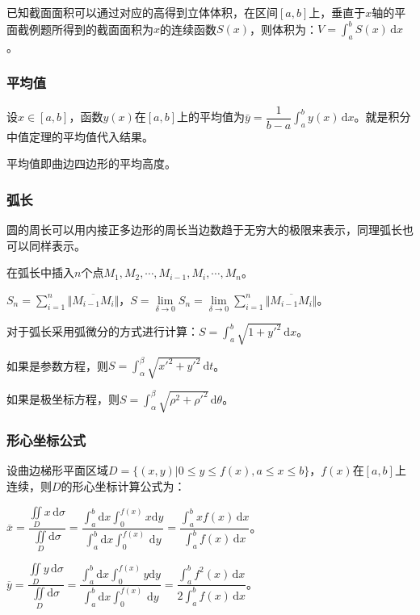 \documentclass[UTF8, 12pt]{ctexart}
\begin{document}
已知截面面积可以通过对应的高得到立体体积，在区间$[a,b]$上，垂直于$x$轴的平面截例题所得到的截面面积为$x$的连续函数$S(x)$，则体积为：$V=\int_a^bS(x)\,\textrm{d}x$。

\subsubsection{平均值}

设$x\in[a,b]$，函数$y(x)$在$[a,b]$上的平均值为$\bar{y}=\dfrac{1}{b-a}\int_a^by(x)\,\textrm{d}x$。就是积分中值定理的平均值代入结果。

平均值即曲边四边形的平均高度。

\subsubsection{弧长}

圆的周长可以用内接正多边形的周长当边数趋于无穷大的极限来表示，同理弧长也可以同样表示。

在弧长中插入$n$个点$M_1,M_2,\cdots,M_{i-1},M_i,\cdots,M_n$。

$S_n=\sum\limits_{i=1}^n\Vert\overline{M_{i-1}M_{i}}\Vert$，$S=\lim\limits_{\delta\to 0}S_n=\lim\limits_{\delta\to 0}\sum\limits_{i=1}^n\Vert\overline{M_{i-1}M_{i}}\Vert$。

对于弧长采用弧微分的方式进行计算：$S=\int_a^b\sqrt{1+y'^2}\,\textrm{d}x$。

如果是参数方程，则$S=\int_\alpha^\beta\sqrt{x'^2+y'^2}\,\textrm{d}t$。

如果是极坐标方程，则$S=\int_\alpha^\beta\sqrt{\rho^2+\rho'^2}\,\textrm{d}\theta$。

\subsubsection{形心坐标公式}

设曲边梯形平面区域$D=\{(x,y)|0\leqslant y\leqslant f(x),a\leqslant x\leqslant b\}$，$f(x)$在$[a,b]$上连续，则$D$的形心坐标计算公式为：

$\overline{x}=\dfrac{\iint\limits_Dx\,\textrm{d}\sigma}{\iint\limits_D\textrm{d}\sigma}=\dfrac{\int_a^b\textrm{d}x\int_0^{f(x)}x\textrm{d}y}{\int_a^b\textrm{d}x\int_0^{f(x)}\,\textrm{d}y}=\dfrac{\int_a^bxf(x)\,\textrm{d}x}{\int_a^bf(x)\,\textrm{d}x}$。

$\overline{y}=\dfrac{\iint\limits_Dy\,\textrm{d}\sigma}{\iint\limits_D\textrm{d}\sigma}=\dfrac{\int_a^b\textrm{d}x\int_0^{f(x)}y\textrm{d}y}{\int_a^b\textrm{d}x\int_0^{f(x)}\,\textrm{d}y}=\dfrac{\int_a^bf^2(x)\,\textrm{d}x}{2\int_a^bf(x)\,\textrm{d}x}$。
\end{document}
